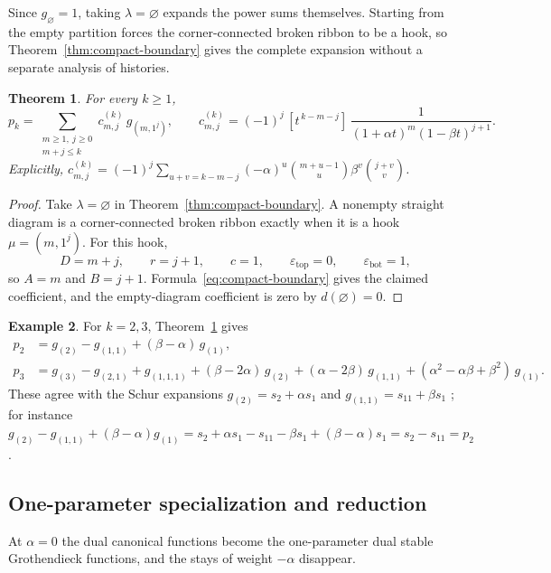 \documentclass[11pt]{amsart}
\numberwithin{equation}{section}
\newtheorem{theorem}{Theorem}[section]
\theoremstyle{definition}
\newtheorem{example}[theorem]{Example}
\theoremstyle{remark}
\newcommand{\one}{\varnothing}
\begin{document}
Since $g_\one=1$, taking $\lambda=\one$ expands the power sums themselves.
Starting from the empty partition forces the corner-connected broken ribbon
to be a hook, so Theorem~\ref{thm:compact-boundary} gives the complete
expansion without a separate analysis of histories.

\begin{theorem}\label{thm:empty-partition}
For every $k\geq1$,
\begin{equation}\label{eq:pk-expansion}
 p_k=\sum_{\substack{m\geq1,\ j\geq0\\ m+j\leq k}}c^{(k)}_{m,j}\,g_{(m,1^j)},
 \qquad
 c^{(k)}_{m,j}=(-1)^j\,[t^{\,k-m-j}]\,\frac{1}{(1+\alpha t)^m(1-\beta t)^{j+1}} .
\end{equation}
Explicitly,
$c^{(k)}_{m,j}=(-1)^j\sum_{u+v=k-m-j}(-\alpha)^u\binom{m+u-1}{u}\beta^v\binom{j+v}{v}$.
\end{theorem}

\begin{proof}
Take $\lambda=\one$ in Theorem~\ref{thm:compact-boundary}. A nonempty
straight diagram is a corner-connected broken ribbon exactly when
it is a hook $\mu=(m,1^j)$. For this hook,
\[
 D=m+j,\qquad r=j+1,\qquad c=1,\qquad
 \varepsilon_{\mathrm{top}}=0,\qquad
 \varepsilon_{\mathrm{bot}}=1,
\]
so $A=m$ and $B=j+1$. Formula~\eqref{eq:compact-boundary} gives the
claimed coefficient, and the empty-diagram coefficient is zero by
$d(\one)=0$.
\end{proof}

\begin{example}\label{ex:pk-small}
For $k=2,3$, Theorem~\ref{thm:empty-partition} gives
\begin{align*}
 p_2&=g_{(2)}-g_{(1,1)}+(\beta-\alpha)\,g_{(1)},\\
 p_3&=g_{(3)}-g_{(2,1)}+g_{(1,1,1)}+(\beta-2\alpha)\,g_{(2)}+(\alpha-2\beta)\,g_{(1,1)}
 +(\alpha^2-\alpha\beta+\beta^2)\,g_{(1)} .
\end{align*}
These agree with the Schur expansions $g_{(2)}=s_2+\alpha s_1$ and
$g_{(1,1)}=s_{11}+\beta s_1$ \cite[Prop.~8.9]{Yeliussizov}; for instance
$g_{(2)}-g_{(1,1)}+(\beta-\alpha)g_{(1)}
=s_2+\alpha s_1-s_{11}-\beta s_1+(\beta-\alpha)s_1=s_2-s_{11}=p_2$.
\end{example}

\subsection{One-parameter specialization and reduction}
\label{sec:one-parameter}
At $\alpha=0$ the dual canonical functions become the one-parameter dual
stable Grothendieck functions, and the stays of weight $-\alpha$ disappear. 
\end{document}
